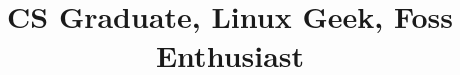 \documentclass[10pt, a4paper]{moderncv}
\title{CS Graduate, Linux Geek, Foss Enthusiast}
\begin{document}
\maketitle

\\



\end{document}
